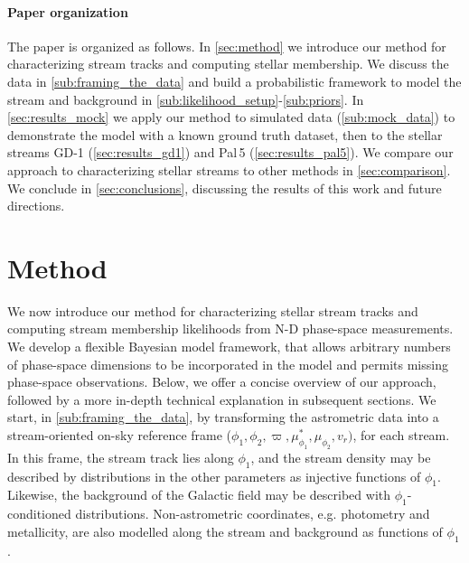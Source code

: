 \documentclass[twocolumn]{aastex631}
\newcommand{\stream}[1]{#1}
\newcommand{\parallax}{\varpi}
\begin{document}
    \paragraph{Paper organization}

        The paper is organized as follows.
        In \autoref{sec:method} we introduce our method for characterizing stream tracks and computing stellar membership.
        We discuss the data in \autoref{sub:framing_the_data} and build a probabilistic framework to model the stream and background in \autoref{sub:likelihood_setup}-\autoref{sub:priors}.
        In \autoref{sec:results_mock} we apply our method to simulated data (\autoref{sub:mock_data}) to demonstrate the model with a known ground truth dataset,
        then to the stellar streams \stream{GD-1} (\autoref{sec:results_gd1}) and \stream{Pal\,5} (\autoref{sec:results_pal5}).
        We compare our approach to characterizing stellar streams to other methods in \autoref{sec:comparison}.
        We conclude in \autoref{sec:conclusions}, discussing the results of this work and future directions.


\section{Method} \label{sec:method}

    We now introduce our method for characterizing stellar stream tracks and computing stream membership likelihoods from N-D phase-space measurements.
    We develop a flexible Bayesian model framework, that allows arbitrary numbers of phase-space dimensions to be incorporated in the model and permits missing phase-space observations. 
    Below, we offer a concise overview of our approach, followed by a more in-depth technical explanation in subsequent sections.
    We start, in \autoref{sub:framing_the_data}, by transforming the astrometric data into
    a stream-oriented on-sky reference frame ($\phi_1, \phi_2, \parallax, \mu_{\phi_1}^*, \mu_{\phi_2}, v_r)$, for each stream. In this frame, 
    the stream track lies along $\phi_1$, and the stream density may be described by distributions in the other parameters as injective functions of $\phi_1$.
    Likewise, the background of the Galactic field may be described with $\phi_1$-conditioned distributions.
    Non-astrometric coordinates, e.g. photometry and metallicity, are also modelled along the stream and background as functions of $\phi_1$.
\end{document}
